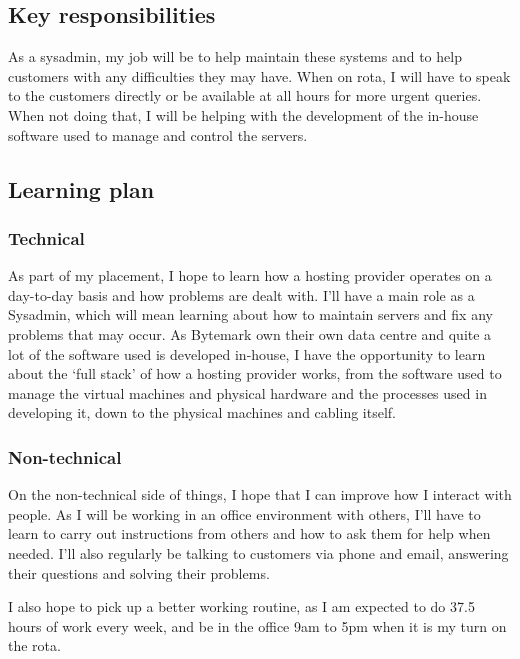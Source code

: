 \documentclass[12pt,a4paper]{article}
\begin{document}
\subsection*{Key responsibilities}
	As a sysadmin, my job will be to help maintain these systems and to help
	customers with any difficulties they may have. When on rota, I will have to
	speak to the customers directly or be available at all hours for more
	urgent queries. When not doing that, I will be helping with the development
	of the in-house software used to manage and control the servers.

\subsection*{Learning plan}
\subsubsection*{Technical}
	As part of my placement, I hope to learn how a hosting provider operates on
	a day-to-day basis and how problems are dealt with. I'll have a main role
	as a Sysadmin, which will mean learning about how to maintain servers and
	fix any problems that may occur. As Bytemark own their own data centre and
	quite a lot of the software used is developed in-house, I have the
	opportunity to learn about the `full stack' of how a hosting provider works,
	from the software used to manage the virtual machines and physical hardware
	and the processes used in developing it, down to the physical machines and
	cabling itself.

\subsubsection*{Non-technical}
	On the non-technical side of things, I hope that I can improve how I
	interact with people. As I will be working in an office environment with
	others, I'll have to learn to carry out instructions from others and how to
	ask them for help when needed. I'll also regularly be talking to customers
	via phone and email, answering their questions and solving their problems.

	I also hope to pick up a better working routine, as I am expected to do
	37.5 hours of work every week, and be in the office 9am to 5pm when it is
	my turn on the rota.
\end{document}
